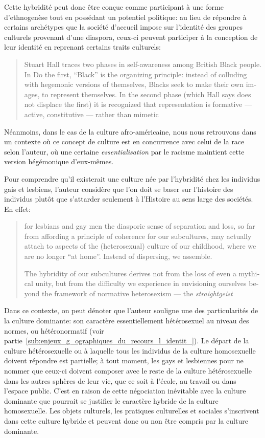 Cette hybridité peut donc être conçue comme participant à une forme d'ethnogenèse tout en possédant un potentiel politique: au lieu de répondre à certains archétypes que la société d'accueil impose sur l'identité des groupes culturels provenant d'une diaspora, ceux-ci peuvent participer à la conception de leur identité en reprenant certains traits culturels:
\foreignblockquote{english}[{\cite[277]{Sinfield1996}}][.]{Stuart Hall traces two phases in self-awareness among British Black people. In Do the first, \enquote{Black} is the organizing principle: instead of colluding with hegemonic versions of themselves, Blacks seek to make their own images, to represent themselves. In the second phase (which Hall says does not displace the first) it is recognized that representation is formative --- active, constitutive --- rather than mimetic}.
Néanmoins, dans le cas de la culture afro-américaine, nous nous retrouvons dans un contexte où ce concept de culture est en concurrence avec celui de la race selon l'auteur, où une certaine \emph{essentialisation} par le racisme maintient cette version hégémonique d'eux-mêmes.

Pour comprendre qu'il existerait une culture née par l'hybridité chez les individus gais et lesbiens, l'auteur considère que l'on doit se baser sur l'histoire des individus plutôt que s'attarder seulement à l'Histoire au sens large des sociétés.
En effet: \foreignblockquote{english}[{\cite[280]{Sinfield1996}}][.]{\textelp{} for lesbians and gay men the diasporic sense of separation and loss, so far from affording a principle of coherence for our subcultures, may actually attach to aspects of the (heterosexual) culture of our childhood, where we are no longer \enquote{at home}. Instead of dispersing, we assemble.

The hybridity of our subcultures derives not from the loss of even a mythical unity, but from the difficulty we experience in envisioning ourselves beyond the framework of normative heterosexism --- the \emph{straightgeist} \textelp{}}
Dans ce contexte, on peut dénoter que l'auteur souligne une des particularités de la culture dominante: son caractère essentiellement hétérosexuel au niveau des normes, ou hétéronormatif (voir partie~\ref{sub:enjeux_g_ographiques_du_recours_l_identit_}).
Le départ de la culture hétérosexuelle ou  à laquelle tous les individus de la culture homosexuelle doivent répondre est partielle; à tout moment, les gays et lesbiennes pour ne nommer que ceux-ci doivent composer avec le reste de la culture hétérosexuelle dans les autres sphères de leur vie, que ce soit à l'école, au travail ou dans l'espace public.
C'est en raison de cette négociation inévitable avec la culture dominante que pourrait se justifier le caractère hybride de la culture homosexuelle.
Les objets culturels, les pratiques culturelles et sociales s'inscrivent dans cette culture hybride et peuvent donc ou non être compris par la culture dominante.

